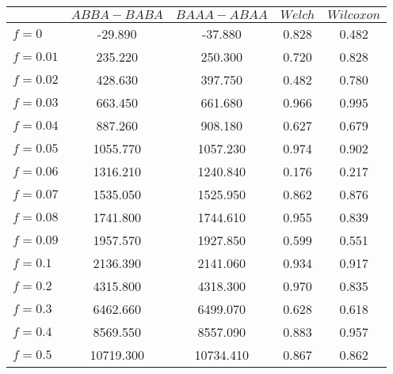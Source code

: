 \begin{tabular}{lcccc}
\toprule
 & $ABBA-BABA$ & $BAAA-ABAA$ & $Welch$ & $Wilcoxon$ \\
\midrule
$f = 0$ & -29.890 & -37.880 & 0.828 & 0.482 \\
$f = 0.01$ & 235.220 & 250.300 & 0.720 & 0.828 \\
$f = 0.02$ & 428.630 & 397.750 & 0.482 & 0.780 \\
$f = 0.03$ & 663.450 & 661.680 & 0.966 & 0.995 \\
$f = 0.04$ & 887.260 & 908.180 & 0.627 & 0.679 \\
$f = 0.05$ & 1055.770 & 1057.230 & 0.974 & 0.902 \\
$f = 0.06$ & 1316.210 & 1240.840 & 0.176 & 0.217 \\
$f = 0.07$ & 1535.050 & 1525.950 & 0.862 & 0.876 \\
$f = 0.08$ & 1741.800 & 1744.610 & 0.955 & 0.839 \\
$f = 0.09$ & 1957.570 & 1927.850 & 0.599 & 0.551 \\
$f = 0.1$ & 2136.390 & 2141.060 & 0.934 & 0.917 \\
$f = 0.2$ & 4315.800 & 4318.300 & 0.970 & 0.835 \\
$f = 0.3$ & 6462.660 & 6499.070 & 0.628 & 0.618 \\
$f = 0.4$ & 8569.550 & 8557.090 & 0.883 & 0.957 \\
$f = 0.5$ & 10719.300 & 10734.410 & 0.867 & 0.862 \\
\bottomrule
\end{tabular}
